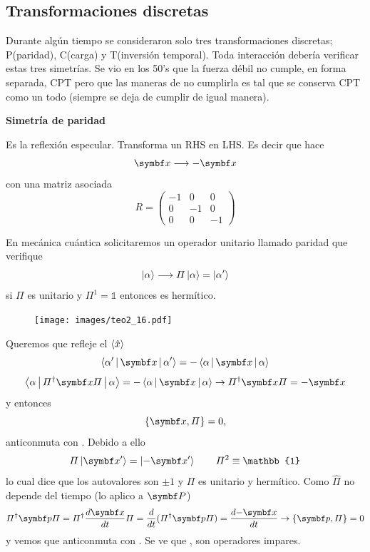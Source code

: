\documentclass[10pt,oneside]{CBFT_book}
\begin{document}
\subsection{Transformaciones discretas}

Durante algún tiempo se consideraron solo tres transformaciones discretas; P(paridad), C(carga) y
T(inversión temporal).
Toda interacción debería verificar estas tres simetrías. Se vio en los 50's que la fuerza débil
no cumple, en forma separada, CPT pero que las maneras de no cumplirla es tal que se conserva
CPT como un todo (siempre se deja de cumplir de igual manera).

{\bf  Simetría de paridad}

Es la reflexión especular.
Transforma un RHS en LHS. Es decir que hace 
\[
	\vb{x} \longrightarrow - \vb{x}
\]
con una matriz asociada
\[
	R = \begin{pmatrix}
	 -1 & 0 & 0 \\
	 0 & -1 & 0 \\
	 0 & 0 & -1
	\end{pmatrix}
\]

En mecánica cuántica solicitaremos un operador unitario llamado paridad que verifique 
\[
	\Ket{\alpha} \longrightarrow \Pi\Ket{\alpha} = \Ket{\alpha'}
\]
si $\Pi$ es unitario y $\Pi^1=\mathbb{1}$ entonces es hermítico.
\begin{figure}[htb]
	\begin{center}
	\texttt{[image: images/teo2\_16.pdf]}
	\end{center}
	\caption{}
\end{figure} 
Queremos que refleje el $\Braket{\hat{x}}$ 
\[
	\Braket{\alpha'|\vb{x}|\alpha'} = - \Braket{\alpha|\vb{x}|\alpha} 
\]
\[
	\Braket{\alpha|\Pi^\dagger\vb{x}\Pi|\alpha} = - \Braket{\alpha|\vb{x}|\alpha} \rightarrow
	\Pi^\dagger\vb{x}\Pi = -\vb{x} 
\]
y entonces 
\[
	\{\vb{x},\Pi\} = 0,
\]
anticonmuta con . Debido a ello 
\[
	\Pi\Ket{\vb{x}'} = \Ket{-\vb{x}'} \qquad \Pi^2 \equiv \mathbb{1}
\]
lo cual dice que los autovalores son $\pm 1$ y $\Pi$ es unitario y hermítico.
Como $\hat{\Pi}$ no depende del tiempo (lo aplico a $\vb P$)
\[
	\Pi^\dagger\vb{p}\Pi = \Pi^\dagger\dtot{\vb{x}}{t}\Pi = \dtot{}{t}(\Pi^\dagger\vb{p}\Pi) = 
	\dtot{-\vb{x}}{t} \rightarrow \{\vb{p},\Pi\}= 0
\]
y vemos que anticonmuta con .
Se ve que ,  son operadores impares. 
\end{document}
